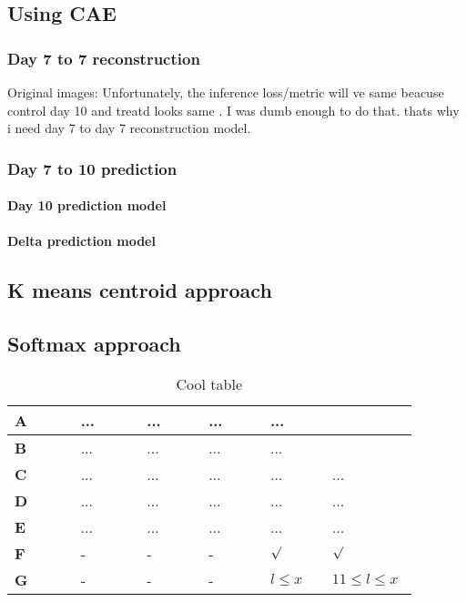 \subsection{Using CAE} \label{subection:Using CAE}
\subsubsection{Day 7 to 7 reconstruction} \label{subsubection:Day 7 to 7 reconstruction}
Original images: Unfortunately, the inference loss/metric will ve same beacuse control day 10 and treatd looks same . I was dumb enough to do that. thats why i need  day 7 to day 7 reconstruction model.
\subsubsection{Day 7 to 10 prediction} \label{subsubection:Day 7 to 10 prediction}
\paragraph{Day 10 prediction model} \label{paragraph:Day 10 prediction model}
\paragraph{Delta prediction model} \label{paragraph:delta prediction}
\subsection{K means centroid approach} \label{subsection:kmeanscentroid}
\subsection{Softmax approach} \label{subsection:kmeanscentroid}




\lipsum[3]
\begin{table}[H]
	\begin{center}
		\def\arraystretch{2}
		\begin{tabular}{p{0.155\linewidth}|p{0.15\linewidth}|p{0.145\linewidth}|p{0.14\linewidth}|p{0.14\linewidth}|p{0.15\linewidth}}
			\textbf{A}& ...	&...	&... &...  \\
			\hline \textbf{B} &...&...&... &... \\
			\hline \textbf{C} & ... &... &... &... &... \\
			\hline \textbf{D} & ... &...&... &... &... \\
			\hline \textbf{E} & ... &... &... &... &... \\
			\hline \textbf{F} & - &- &- &$\surd$  &$\surd$  \\
			\hline \textbf{G} & - & -& - & $l \leq x$ & $11 \leq l \leq x$\\
		\end{tabular}
	\end{center}
	\caption{Cool table}
	\label{tab:cool_table}
\end{table}